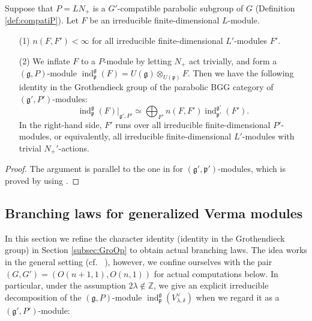 \begin{fact}
\label{fact:Grobranch}
Suppose that $P=L N_+$ is a $G'$-compatible parabolic subgroup of $G$
 (Definition \ref{def:compatiP}).  
Let $F$ be an irreducible finite-dimensional $L$-module.  
\begin{enumerate}
\item[{\rm{(1)}}]
$n(F,F')<\infty$ for all irreducible finite-dimensional $L'$-modules $F'$.  
\item[{\rm{(2)}}]
We inflate $F$ to a $P$-module 
 by letting $N_+$ act trivially,
 and form a $({\mathfrak{g}},P)$-module
 ${\operatorname{ind}}_{\mathfrak{p}}^{\mathfrak{g}}(F)
  = U({\mathfrak{g}}) \otimes_{U(\mathfrak{p})} F$.  
Then we have the following identity
 in the Grothendieck group
 of the parabolic BGG category
 of $({\mathfrak{g}}',P')$-modules:
\[
{\operatorname{ind}}_{\mathfrak{p}}^{\mathfrak{g}}(F)|_{{\mathfrak{g}}',P'}
\simeq
\bigoplus_{F'}
n(F,F') 
{\operatorname{ind}}_{\mathfrak{p}'}^{\mathfrak{g}'}(F').  
\]
In the right-hand side, 
 $F'$ runs over all irreducible finite-dimensional $P'$-modules, 
 or equivalently, 
 all irreducible finite-dimensional $L'$-modules
 with trivial $N_+'$-actions.  
\end{enumerate}
\end{fact}

\begin{proof}
The argument is parallel to the one
 in \cite[Thm.~3.5]{KOSS}
 for $({\mathfrak{g}}',{\mathfrak{p}}')$-modules,
 which is proved by using \cite[Prop.~5.2]{xktransgp12}.  
\end{proof}
\subsection{Branching laws for generalized Verma modules}
\label{subsec:branchVerma}

In this section we refine the character identity
 (identity in the Grothendieck group)
 in Section \ref{subsec:GroOp}
 to obtain actual branching laws.  
The idea works in the general setting
 (cf.~ \cite[Sect.~3]{KOSS}), 
however,
 we confine ourselves with the pair $(G,G')=(O(n+1,1),O(n,1))$
 for actual computations below.  
In particular,
 under the assumption $2 \lambda \not \in {\mathbb{Z}}$, 
 we give an explicit irreducible decomposition 
 of the $({\mathfrak{g}},P)$-module
$
   {\operatorname{ind}}_{\mathfrak{p}}^{\mathfrak{g}}(V_{\lambda,\delta}^{\vee})
$
 when we regard it 
 as a $({\mathfrak{g}}',P')$-module:

